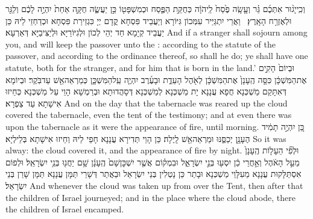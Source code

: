 {וְכִֽי\maqqaf יָג֨וּר אִתְּכֶ֜ם גֵּ֗ר וְעָ֤שָֽׂה פֶ֙סַח֙ לַֽיהֹוָ֔ה כְּחֻקַּ֥ת הַפֶּ֛סַח וּכְמִשְׁפָּט֖וֹ כֵּ֣ן יַעֲשֶׂ֑ה חֻקָּ֤ה אַחַת֙ יִהְיֶ֣ה לָכֶ֔ם וְלַגֵּ֖ר וּלְאֶזְרַ֥ח הָאָֽרֶץ׃ \setuma }
{וַאֲרֵי יִתְגַּיַּיר עִמְּכוֹן גִּיּוֹרָא וְיַעֲבֵיד פִּסְחָא קֳדָם יְיָ כִּגְזֵירַת פִּסְחָא וּכְדַחְזֵי לֵיהּ כֵּן יַעֲבֵיד קְיָמָא חַד יְהֵי לְכוֹן וּלְגִיּוֹרַיָּא וּלְיַצִּיבַיָּא דְּאַרְעָא׃}
{And if a stranger shall sojourn among you, and will keep the passover unto the \lord: according to the statute of the passover, and according to the ordinance thereof, so shall he do; ye shall have one statute, both for the stranger, and for him that is born in the land.’}{}
{וּבְיוֹם֙ הָקִ֣ים אֶת\maqqaf הַמִּשְׁכָּ֔ן כִּסָּ֤ה הֶֽעָנָן֙ אֶת\maqqaf הַמִּשְׁכָּ֔ן לְאֹ֖הֶל הָעֵדֻ֑ת וּבָעֶ֜רֶב יִהְיֶ֧ה עַֽל\maqqaf הַמִּשְׁכָּ֛ן כְּמַרְאֵה\maqqaf אֵ֖שׁ עַד\maqqaf בֹּֽקֶר׃}
{וּבְיוֹמָא דְּאִתָּקַם מַשְׁכְּנָא חֲפָא עֲנָנָא יָת מַשְׁכְּנָא לְמַשְׁכְּנָא דְּסָהֲדוּתָא וּבְרַמְשָׁא הָוֵי עַל מַשְׁכְּנָא כְּחֵיזוּ אִישָׁתָא עַד צַפְרָא׃}
{And on the day that the tabernacle was reared up the cloud covered the tabernacle, even the tent of the testimony; and at even there was upon the tabernacle as it were the appearance of fire, until morning.}{}
{כֵּ֚ן יִהְיֶ֣ה תָמִ֔יד הֶעָנָ֖ן יְכַסֶּ֑נּוּ וּמַרְאֵה\maqqaf אֵ֖שׁ לָֽיְלָה׃}
{כֵּן הָוֵי תְּדִירָא עֲנָנָא חָפֵי לֵיהּ וְחֵיזוּ אִישָׁתָא בְּלֵילְיָא׃}
{So it was alway: the cloud covered it, and the appearance of fire by night.}{}
{וּלְפִ֞י הֵעָל֤וֹת הֶֽעָנָן֙ מֵעַ֣ל הָאֹ֔הֶל וְאַ֣חֲרֵי כֵ֔ן יִסְע֖וּ בְּנֵ֣י יִשְׂרָאֵ֑ל וּבִמְק֗וֹם אֲשֶׁ֤ר יִשְׁכׇּן\maqqaf שָׁם֙ הֶֽעָנָ֔ן שָׁ֥ם יַחֲנ֖וּ בְּנֵ֥י יִשְׂרָאֵֽל׃}
{וּלְפוֹם אִסְתַּלָּקוּת עֲנָנָא מֵעִלָּוֵי מַשְׁכְּנָא וּבָתַר כֵּן נָטְלִין בְּנֵי יִשְׂרָאֵל וּבַאֲתַר דְּשָׁרֵי תַּמָּן עֲנָנָא תַּמָּן שָׁרַן בְּנֵי יִשְׂרָאֵל׃}
{And whenever the cloud was taken up from over the Tent, then after that the children of Israel journeyed; and in the place where the cloud abode, there the children of Israel encamped.}{}
